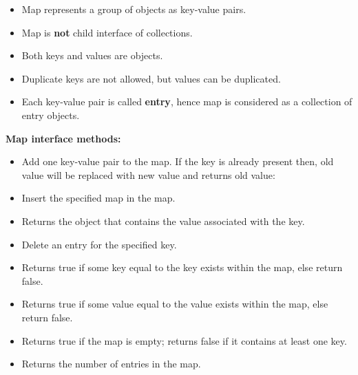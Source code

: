 \setlength{\columnsep}{3pt}
\begin{flushleft}
	
	\begin{itemize}
		\item Map represents a group of objects as key-value pairs.	
		
		\item Map is \textbf{not} child interface of collections.
		


		\item Both keys and values are objects.
		\item Duplicate keys are not allowed, but values can be duplicated.
		\item Each key-value pair is called \textbf{entry}, hence map is considered as a collection of entry objects.
		
	\end{itemize}

	\textbf{Map interface methods:}
	
	\begin{itemize}
		\item Add one key-value pair to the map. If the key is already present then, old value will be replaced with new value and returns old value:
		\newpage
		\item  Insert the specified map in the map.
		\bigskip
		\item Returns the object that contains the value associated with the key.
		\bigskip
		\item Delete an entry for the specified key.
		\bigskip
		\item Returns true if some key equal to the key exists within the map, else return false.
		\bigskip
		\item Returns true if some value equal to the value exists within the map, else return false.
		\bigskip
		\item Returns true if the map is empty; returns false if it contains at least one key.
		\bigskip
		\item Returns the number of entries in the map.
		
	\end{itemize}
	
\end{flushleft}

\newpage

